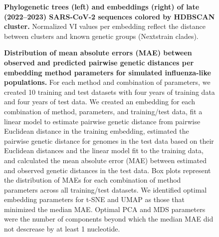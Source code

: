 \documentclass[webpdf,contemporary,large,single]{oup-authoring-template}%
\theoremstyle{thmstyleone}%
\theoremstyle{thmstyletwo}%
\theoremstyle{thmstylethree}%
\begin{document}
\begin{figure}[H]
\caption{{\bf Phylogenetic trees (left) and embeddings (right) of late (2022--2023) SARS-CoV-2 sequences colored by HDBSCAN cluster.}
  Normalized VI values per embedding reflect the distance between clusters and known genetic groups (Nextstrain clades).
}\label{fig:sars-cov-2-2022-2023-clusters-vs-Nextstrain-clade}
\end{figure}

\pagebreak

\setcounter{figure}{0}
\setcounter{table}{0}

\captionsetup[figure]{name=Supplementary Fig. S}
\captionsetup[table]{name=Supplementary Table S}

\begin{figure}[H]
  \caption{{\bf Distribution of mean absolute errors (MAE) between observed and predicted pairwise genetic distances per embedding method parameters for simulated influenza-like populations.}
    For each method and combination of parameters, we created 10 training and test datasets with four years of training data and four years of test data.
    We created an embedding for each combination of method, parameters, and training/test data, fit a linear model to estimate pairwise genetic distance from pairwise Euclidean distance in the training embedding, estimated the pairwise genetic distance for genomes in the test data based on their Euclidean distances and the linear model fit to the training data, and calculated the mean absolute error (MAE) between estimated and observed genetic distances in the test data.
    Box plots represent the distribution of MAEs for each combination of method parameters across all training/test datasets.
    We identified optimal embedding parameters for t-SNE and UMAP as those that minimized the median MAE.
    Optimal PCA and MDS parameters were the number of components beyond which the median MAE did not descrease by at least 1 nucleotide.
  }\label{S_Fig_simulated_flu_errors}
\end{figure}
\end{document}
